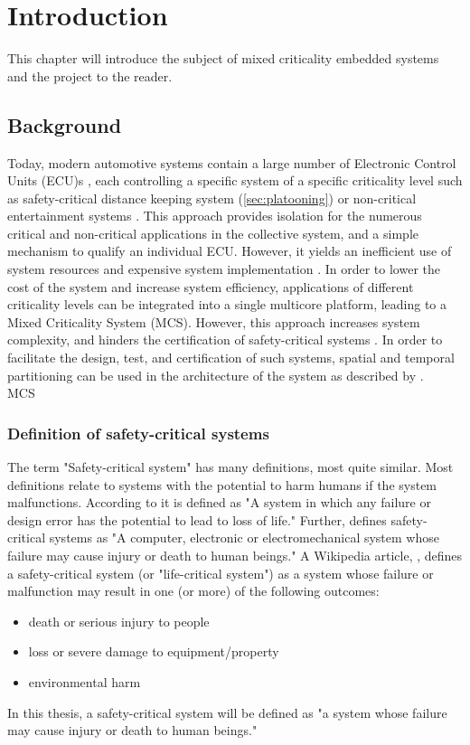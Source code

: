 \chapter{Introduction}
\label{sec:introduction}
This chapter will introduce the subject of mixed criticality embedded systems and the project to the reader.

\section{Background}
Today, modern automotive systems contain a large number of Electronic Control Units (ECU)s \cite{}, each controlling a specific system of a specific criticality level such as safety-critical distance keeping system (\ref{sec:platooning}) or non-critical entertainment systems \cite{}. This approach provides isolation for the numerous critical and non-critical applications in the collective system, and a simple mechanism to qualify an individual ECU. However, it yields an inefficient use of system resources \cite{} and expensive system implementation \cite{}. In order to lower the cost of the system and increase system efficiency, applications of different criticality levels can be integrated into a single multicore platform, leading to a Mixed Criticality System (MCS). However, this approach increases system complexity, and hinders the certification of safety-critical systems \cite{}. In order to facilitate the design, test, and certification of such systems, spatial and temporal partitioning can be used in the architecture of the system as described by \cite{zaki2016}.\\

MCS

\subsection{Definition of safety-critical systems}
The term "Safety-critical system" has many definitions, most quite similar. Most definitions relate to systems with the potential to harm humans if the system malfunctions. According to \cite{website:encyclopedia} it is defined as "A system in which any failure or design error has the potential to lead to loss of life." Further, \cite{website:dictionary} defines safety-critical systems as "A computer, electronic or electromechanical system whose failure may cause injury or death to human beings." A Wikipedia article, \cite{website:wikipedia}, defines a safety-critical system (or "life-critical system") as a system whose failure or malfunction may result in one (or more) of the following outcomes:
\begin{itemize}
\item death or serious injury to people
\item loss or severe damage to equipment/property
\item environmental harm
\end{itemize}
In this thesis, a safety-critical system will be defined as "a system whose failure may cause injury or death to human beings."

